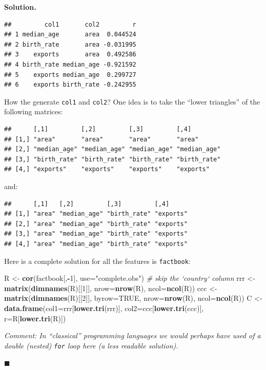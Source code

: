 \documentclass[10pt,b5paper,krantz1]{krantz}
\newenvironment{Shaded}{\begin{snugshade}}{\end{snugshade}}
\newcommand{\CommentTok}[1]{\textcolor[rgb]{0.37,0.37,0.37}{\textit{#1}}}
\newcommand{\DataTypeTok}[1]{\textcolor[rgb]{0.27,0.27,0.27}{#1}}
\newcommand{\DecValTok}[1]{\textcolor[rgb]{0.06,0.06,0.06}{#1}}
\newcommand{\KeywordTok}[1]{\textcolor[rgb]{0.27,0.27,0.27}{\textbf{#1}}}
\newcommand{\NormalTok}[1]{#1}
\newcommand{\OperatorTok}[1]{\textcolor[rgb]{0.43,0.43,0.43}{\textbf{#1}}}
\newcommand{\OtherTok}[1]{\textcolor[rgb]{0.37,0.37,0.37}{#1}}
\newcommand{\StringTok}[1]{\textcolor[rgb]{0.5,0.5,0.5}{#1}}
\newenvironment{solution}{%
\bigskip\noindent\textbf{Solution. }%
\it\ignorespaces%
\ignorespaces%
}{\ignorespaces%
\hfill$\blacksquare$%
}
\begin{document}
\begin{solution}
\begin{verbatim}
##         col1       col2         r
## 1 median_age       area  0.044524
## 2 birth_rate       area -0.031995
## 3    exports       area  0.492586
## 4 birth_rate median_age -0.921592
## 5    exports median_age  0.299727
## 6    exports birth_rate -0.242955
\end{verbatim}

How the generate \texttt{col1} and \texttt{col2}?
One idea is to take the ``lower triangles'' of the following matrices:

\begin{verbatim}
##      [,1]         [,2]         [,3]         [,4]        
## [1,] "area"       "area"       "area"       "area"      
## [2,] "median_age" "median_age" "median_age" "median_age"
## [3,] "birth_rate" "birth_rate" "birth_rate" "birth_rate"
## [4,] "exports"    "exports"    "exports"    "exports"
\end{verbatim}

and:

\begin{verbatim}
##      [,1]   [,2]         [,3]         [,4]     
## [1,] "area" "median_age" "birth_rate" "exports"
## [2,] "area" "median_age" "birth_rate" "exports"
## [3,] "area" "median_age" "birth_rate" "exports"
## [4,] "area" "median_age" "birth_rate" "exports"
\end{verbatim}

Here is a complete solution for all the features is \texttt{factbook}:

\begin{Shaded}
\begin{Highlighting}[]
\NormalTok{R <-}\StringTok{ }\KeywordTok{cor}\NormalTok{(factbook[,}\OperatorTok{-}\DecValTok{1}\NormalTok{], }\DataTypeTok{use=}\StringTok{"complete.obs"}\NormalTok{) }\CommentTok{# skip the `country` column}
\NormalTok{rrr <-}\StringTok{ }\KeywordTok{matrix}\NormalTok{(}\KeywordTok{dimnames}\NormalTok{(R)[[}\DecValTok{1}\NormalTok{]], }\DataTypeTok{nrow=}\KeywordTok{nrow}\NormalTok{(R), }\DataTypeTok{ncol=}\KeywordTok{ncol}\NormalTok{(R))}
\NormalTok{ccc <-}\StringTok{ }\KeywordTok{matrix}\NormalTok{(}\KeywordTok{dimnames}\NormalTok{(R)[[}\DecValTok{2}\NormalTok{]], }\DataTypeTok{byrow=}\OtherTok{TRUE}\NormalTok{, }\DataTypeTok{nrow=}\KeywordTok{nrow}\NormalTok{(R), }\DataTypeTok{ncol=}\KeywordTok{ncol}\NormalTok{(R))}
\NormalTok{C <-}\StringTok{ }\KeywordTok{data.frame}\NormalTok{(}\DataTypeTok{col1=}\NormalTok{rrr[}\KeywordTok{lower.tri}\NormalTok{(rrr)],}
                \DataTypeTok{col2=}\NormalTok{ccc[}\KeywordTok{lower.tri}\NormalTok{(ccc)],}
                \DataTypeTok{r=}\NormalTok{R[}\KeywordTok{lower.tri}\NormalTok{(R)])}
\end{Highlighting}
\end{Shaded}

\emph{Comment: In ``classical'' programming languages we would perhaps
have used of a double (nested) \texttt{for} loop here (a less readable solution).}

\end{solution}
\end{document}
